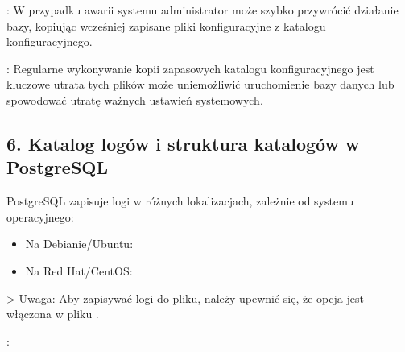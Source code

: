 \documentclass[a4paper,11pt,openany,english]{sphinxmanual}
\begin{document}
\sphinxAtStartPar
{}: W przypadku awarii systemu administrator może szybko przywrócić działanie bazy, kopiując wcześniej zapisane pliki konfiguracyjne z katalogu konfiguracyjnego.

\sphinxAtStartPar
{}: Regularne wykonywanie kopii zapasowych katalogu konfiguracyjnego jest kluczowe \textendash{} utrata tych plików może uniemożliwić uruchomienie bazy danych lub spowodować utratę ważnych ustawień systemowych.


\subsection{6. Katalog logów i struktura katalogów w PostgreSQL}
\label{\detokenize{rozdzial2/Konfiguracja_baz_danych/Konfiguracja_baz_danych:katalog-logow-i-struktura-katalogow-w-postgresql}}
\sphinxAtStartPar
{}
PostgreSQL zapisuje logi w różnych lokalizacjach, zależnie od systemu operacyjnego:
\begin{itemize}
\item {} 
\sphinxAtStartPar
Na Debianie/Ubuntu: 

\item {} 
\sphinxAtStartPar
Na Red Hat/CentOS: 

\end{itemize}

\sphinxAtStartPar
\textgreater{} Uwaga: Aby zapisywać logi do pliku, należy upewnić się, że opcja  jest włączona w pliku .

\sphinxAtStartPar
{}:

\begin{sphinxVerbatim}[commandchars=\\\{\}]
         
       
       
      
       
    
  
  
      
    
\end{sphinxVerbatim}
\end{document}
